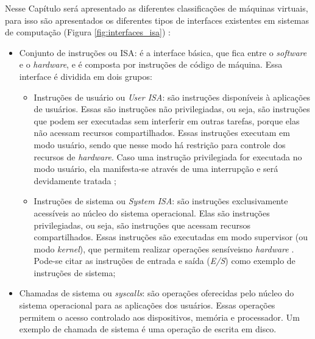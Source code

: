 Nesse Capítulo será apresentado as diferentes classificações de máquinas virtuais, para isso são apresentados os diferentes tipos de 
interfaces existentes em sistemas de computação (Figura \ref{fig:interfaces_isa}) \cite{maziero2013}:
\begin{itemize}
 \item Conjunto de instruções ou \ac{ISA}: é a interface básica, que fica entre o \textit{software} e o \textit{hardware}, e é composta por 
 instruções de código de máquina. Essa interface é dividida em dois grupos:
 \begin{itemize}
  \item Instruções de usuário ou \textit{User \ac{ISA}}: são instruções disponíveis à aplicações de usuários. Essas são instruções 
  não privilegiadas, ou seja, são instruções que podem ser executadas sem interferir em outras tarefas, porque elas não acessam recursos 
  compartilhados. Essas instruções executam em modo usuário, sendo que nesse modo há restrição para controle dos recursos de \textit{hardware}. 
  Caso uma instrução privilegiada for executada no modo usuário, ela manifesta-se através de uma interrupção e será devidamente tratada 
  \cite{buyya2013};
  \item Instruções de sistema ou \textit{System \ac{ISA}}: são instruções exclusivamente acessíveis ao núcleo do sistema operacional. Elas 
  são instruções privilegiadas, ou seja, são instruções que acessam recursos compartilhados. Essas instruções são executadas em modo supervisor 
  (ou modo \textit{kernel}), que permitem realizar operações sensíveis\footnotemark[1] no \textit{hardware} \cite{buyya2013}. 
  Pode-se citar as instruções de entrada e saída (\textit{E/S}) como exemplo de instruções de sistema;
 \end{itemize}
 \item Chamadas de sistema ou \textit{syscalls}: são operações oferecidas pelo núcleo do sistema operacional para as aplicações dos usuários.
 Essas operações permitem o acesso controlado aos dispositivos, memória e processador. Um exemplo de chamada de sistema é uma operação de escrita 
 em disco.
\end{itemize}


